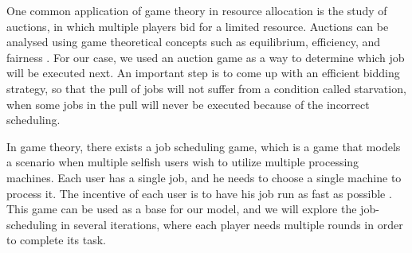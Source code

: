 One common application of game theory in resource allocation is the study of auctions, 
in which multiple players bid for a limited resource. Auctions can be analysed using 
game theoretical concepts such as equilibrium, efficiency, and fairness \cite{9244046}. 
For our case, we used an auction game as a way to determine which job will be executed 
next. An important step is to come up with an efficient bidding strategy, so that the 
pull of jobs will not suffer from a condition called starvation, when some jobs in the 
pull will never be executed because of the incorrect scheduling.

In game theory, there exists a job scheduling game, which is a game that models a 
scenario when multiple selfish users wish to utilize multiple processing machines. 
Each user has a single job, and he needs to choose a single machine to process it. 
The incentive of each user is to have his job run as fast as possible \cite{noauthor_job_2021}. 
This game can be used as a base for our model, and we will explore the job-scheduling 
in several iterations, where each player needs multiple rounds in order to complete its task.
